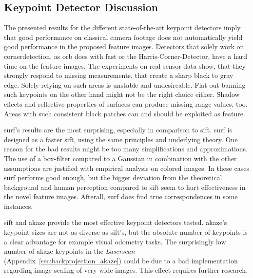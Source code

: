 \subsection{Keypoint Detector Discussion}

The presented results for the different state-of-the-art keypoint detectors imply that good performance on classical camera footage does not automatically yield good performance in the proposed feature images.
Detectors that solely work on cornerdetection, as \acrshort{orb} does with \acrshort{fast} or the Harris-Corner-Detector, have a hard time on the feature images.
The experiments on real sensor data show, that they strongly respond to missing measurements, that create a sharp black to gray edge.
Solely relying on such areas is unstable and undesireable.
Flat out banning such keypoints on the other hand might not be the right choice either.
Shadow effects and reflective properties of surfaces can produce missing range values, too.
Areas with such consistent black patches can and should be exploited as feature.

\acrshort{surf}'s results are the most surprising, especially in comparison to \acrshort{sift}.
\acrshort{surf} is designed as a faster \acrshort{sift}, using the same principles and underlying theory.
One reason for the bad results might be too many simplifications and approximations.
The use of a box-filter compared to a Gaussian in combination with the other assumptions are justified with empirical analysis on colored images.
In these cases \acrshort{surf} performs good enough, but the bigger deviation from the theoretical background and human perception compared to \acrshort{sift} seem to hurt effectiveness in the novel feature images.
Afterall, \acrshort{surf} does find true correspondences in some instances.

\acrshort{sift} and \acrshort{akaze} provide the most effective keypoint detectors tested.
\acrshort{akaze}'s keypoint sizes are not as diverse as \acrshort{sift}'s, but the absolute number of keypoints is a clear advantage for example visual odometry tasks.
The surprisingly low number of \acrshort{akaze} keypoints in the \emph{Laserscan} (Appendix~\ref{sec:backprojection_akaze}) could be due to a bad implementation regarding image scaling of very wide images.
This effect requires further research.
